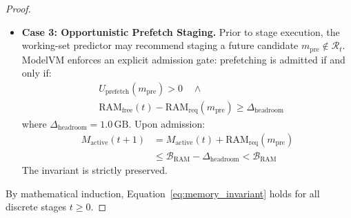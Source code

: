 \begin{proof}
\begin{itemize}
\begin{enumerate}
\begin{equation}
        \end{equation}
        yielding:
        \begin{equation}
        \begin{aligned}
        M_{\text{active}}(t+1) &= M_{\text{active}}' + \text{RAM}_{\text{req}}(M_{t+1}) \\
        &\le \mathcal{B}_{\text{RAM}}
        \end{aligned}
        \end{equation}
    \end{enumerate}
    The invariant is preserved across all successful cache-miss transitions.

    \item \textbf{Case 3: Opportunistic Prefetch Staging.} Prior to stage execution, the working-set predictor may recommend staging a future candidate $m_{\text{pre}} \notin \mathcal{R}_t$. ModelVM enforces an explicit admission gate: prefetching is admitted if and only if:
    \begin{equation}
    \begin{aligned}
    &U_{\text{prefetch}}(m_{\text{pre}}) > 0 \quad \land \\
    &\text{RAM}_{\text{free}}(t) - \text{RAM}_{\text{req}}(m_{\text{pre}}) \ge \Delta_{\text{headroom}}
    \end{aligned}
    \end{equation}
    where $\Delta_{\text{headroom}} = 1.0\,\text{GB}$. Upon admission:
    \begin{equation}
    \begin{aligned}
    M_{\text{active}}(t+1) &= M_{\text{active}}(t) + \text{RAM}_{\text{req}}(m_{\text{pre}}) \\
    &\le \mathcal{B}_{\text{RAM}} - \Delta_{\text{headroom}} < \mathcal{B}_{\text{RAM}}
    \end{aligned}
    \end{equation}
    The invariant is strictly preserved.
\end{itemize}
By mathematical induction, Equation~\eqref{eq:memory_invariant} holds for all discrete stages $t \ge 0$.
\end{proof}


